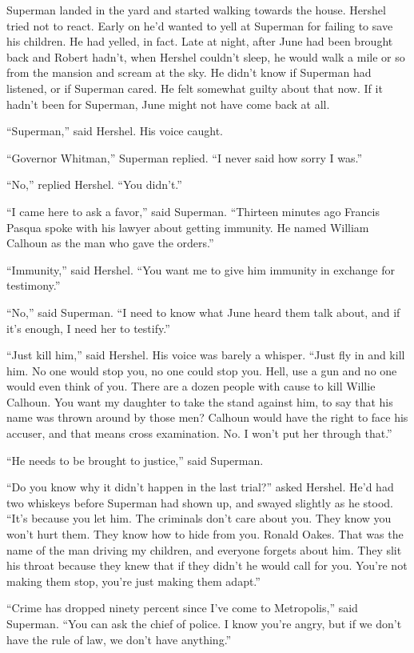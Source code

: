Superman landed in the yard and started walking towards the house.
Hershel tried not to react. Early on he'd wanted to yell at Superman for
failing to save his children. He had yelled, in fact. Late at night,
after June had been brought back and Robert hadn't, when Hershel
couldn't sleep, he would walk a mile or so from the mansion and scream
at the sky. He didn't know if Superman had listened, or if Superman
cared. He felt somewhat guilty about that now. If it hadn't been for
Superman, June might not have come back at all.

``Superman,'' said Hershel. His voice caught.

``Governor Whitman,'' Superman replied. ``I never said how sorry I
was.''

``No,'' replied Hershel. ``You didn't.''

``I came here to ask a favor,'' said Superman. ``Thirteen minutes ago
Francis Pasqua spoke with his lawyer about getting immunity. He named
William Calhoun as the man who gave the orders.''

``Immunity,'' said Hershel. ``You want me to give him immunity in
exchange for testimony.''

``No,'' said Superman. ``I need to know what June heard them talk about,
and if it's enough, I need her to testify.''

``Just kill him,'' said Hershel. His voice was barely a whisper. ``Just
fly in and kill him. No one would stop you, no one could stop you. Hell,
use a gun and no one would even think of you. There are a dozen people
with cause to kill Willie Calhoun. You want my daughter to take the
stand against him, to say that his name was thrown around by those men?
Calhoun would have the right to face his accuser, and that means cross
examination. No. I won't put her through that.''

``He needs to be brought to justice,'' said Superman.

``Do you know why it didn't happen in the last trial?'' asked Hershel.
He'd had two whiskeys before Superman had shown up, and swayed slightly
as he stood. ``It's because you let him. The criminals don't care about
you. They know you won't hurt them. They know how to hide from you.
Ronald Oakes. That was the name of the man driving my children, and
everyone forgets about him. They slit his throat because they knew that
if they didn't he would call for you. You're not making them stop,
you're just making them adapt.''

``Crime has dropped ninety percent since I've come to Metropolis,'' said
Superman. ``You can ask the chief of police. I know you're angry, but if
we don't have the rule of law, we don't have anything.''

